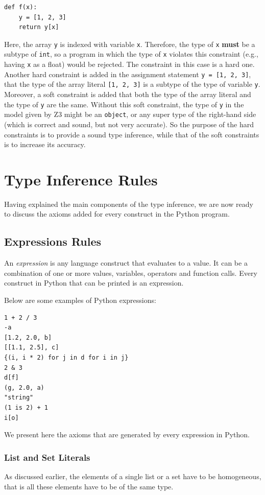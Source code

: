 \begin{lstlisting}
def f(x):
	y = [1, 2, 3]
	return y[x]
\end{lstlisting}

Here, the array \lstinline|y| is indexed with variable \lstinline|x|. Therefore, the type of \lstinline|x| \textbf{must} be a subtype of \lstinline|int|, so a program in which the type of \lstinline|x| violates this constraint (e.g., having \lstinline|x| as a float) would be rejected. The constraint in this case is a hard one. Another hard constraint is added in the assignment statement \lstinline|y = [1, 2, 3]|, that the type of the array literal \lstinline|[1, 2, 3]| is a subtype of the type of variable \lstinline|y|. Moreover, a soft constraint is added that both the type of the array literal and the type of \lstinline|y| are the same. Without this soft constraint, the type of \lstinline|y| in the model given by Z3 might be an \lstinline|object|, or any super type of the right-hand side (which is correct and sound, but not very accurate). So the purpose of the hard constraints is to provide a sound type inference, while that of the soft constraints is to increase its accuracy.
\section{Type Inference Rules}
Having explained the main components of the type inference, we are now ready to discuss the axioms added for every construct in the Python program.
\subsection{Expressions Rules}
An \textit{expression} is any language construct that evaluates to a value. It can be a combination of one or more values, variables, operators and function calls. Every construct in Python that can be printed is an expression.

Below are some examples of Python expressions:
\begin{lstlisting}
1 + 2 / 3
-a
[1.2, 2.0, b]
[[1.1, 2.5], c]
{(i, i * 2) for j in d for i in j}
2 & 3
d[f]
(g, 2.0, a)
"string"
(1 is 2) + 1
i[o]
\end{lstlisting}

We present here the axioms that are generated by every expression in Python.

\subsubsection{List and Set Literals}
As discussed earlier, the elements of a single list or a set have to be homogeneous, that is all these elements have to be of the same type.

